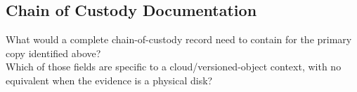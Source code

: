 \begin{answerbox}
\vspace{3cm}
\end{answerbox}

\subsection{Chain of Custody Documentation}

\begin{questionbox}
What would a complete chain-of-custody record need to contain for the primary copy identified above? \\
Which of those fields are specific to a cloud/versioned-object context, with no equivalent when the evidence is a physical disk?
\end{questionbox}

\begin{answerbox}
\vspace{3cm}
\end{answerbox}
